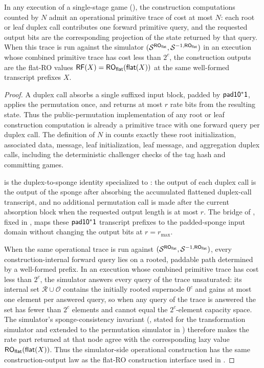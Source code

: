\begin{lemma}
\label{lem:operational-duplex-trace}
In any execution of a single-stage \TW{} game
(), the construction computations counted
by $N$ admit an operational primitive trace of cost at most $N$:
each root or leaf duplex call contributes one forward primitive query,
and the requested output bits are the corresponding projection of the
state returned by that query. When this trace is run against the
\cite{BDPV08} simulator $(\mathcal{S}^{\mathsf{RO}_{\mathsf{flat}}},\mathcal{S}^{-1,\mathsf{RO}_{\mathsf{flat}}})$ in an
execution whose combined primitive trace has cost less than $2^c$, the
construction outputs are the flat-RO values
$\mathsf{RF}(X)=\mathsf{RO}_{\mathsf{flat}}(\mathsf{flat}(X))$ at the same well-formed \TW{} transcript
prefixes $X$.
\end{lemma}

\begin{proof}
A \TW{} duplex call absorbs a single suffixed input block, padded by
$\mathsf{pad10^*1}$, applies the permutation once, and returns at most $r$
rate bits from the resulting state. Thus the public-permutation
implementation of any root or leaf construction computation is already
a primitive trace with one forward query per duplex call. The definition
of $N$ in  counts exactly these root initialization,
associated data, message, leaf initialization, leaf message, and
aggregation duplex calls, including the deterministic challenger checks
of the tag hash and committing games.

 is the \cite[Lemma~3]{BDPV11} duplex-to-sponge
identity specialized to \TW{}: the output of each duplex call is the
output of the sponge after absorbing the accumulated flattened
duplex-call transcript, and no additional permutation call is made after
the current absorption block when the requested output length is at most
$r$. The bridge of , fixed in
, maps these $\mathsf{pad10^*1}$ transcript prefixes to the
\cite{BDPV08} padded-sponge input domain without changing the output bits
at $r=r_{\max}$.

When the same operational trace is run against
$(\mathcal{S}^{\mathsf{RO}_{\mathsf{flat}}},\mathcal{S}^{-1,\mathsf{RO}_{\mathsf{flat}}})$, every construction-internal forward
query lies on a rooted, paddable path determined by a well-formed \TW{}
prefix. In an execution whose combined primitive trace has cost less
than $2^c$, the simulator answers every query of the trace
unsaturated: its internal set $\mathcal{R} \cup \mathcal{O}$ contains
the initially rooted supernode $0^c$ and gains at most one element per
answered query, so when any query of the trace is answered the set has
fewer than $2^c$ elements and cannot equal the $2^c$-element capacity
space. The simulator's sponge-consistency invariant
(\cite[Lemma~2]{BDPV08}, stated for the transformation simulator and
extended to the permutation simulator in \cite[\S4.3]{BDPV08})
therefore makes the rate part returned at that node agree with the
corresponding lazy value $\mathsf{RO}_{\mathsf{flat}}(\mathsf{flat}(X))$. Thus the simulator-side operational construction
has the same construction-output law as the flat-RO construction
interface used in .
\end{proof}


